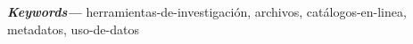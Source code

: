 \documentclass[runningheads]{llncs}
\providecommand{\keywords}[1]
{
  \small	
  \textbf{\textit{Keywords---}} #1
}
\begin{document}
\begin{abstract}
      
\end{abstract}
\keywords{herramientas-de-investigación, archivos, catálogos-en-linea, metadatos, uso-de-datos}
\end{document}
